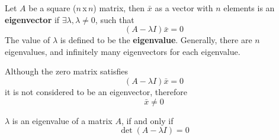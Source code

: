 \documentclass[diffeq.tex]{subfiles}
\begin{document}
    \begin{definition}
        Let $A$ be a square ($n$\,x\,$n$) matrix, then $\bar{x}$ as a vector with $n$ elements is an \textbf{eigenvector} if $\exists \lambda, \lambda \neq 0$, such that
        \begin{equation}
            (A - \lambda I)\bar{x} = 0
        \end{equation}
        The value of $\lambda$ is defined to be the \textbf{eigenvalue}.
        Generally, there are $n$ eigenvalues, and infinitely many eigenvectors for each eigenvalue.
    \end{definition}
    \begin{remark}
        Although the zero matrix satisfies
        \begin{equation}
            (A - \lambda I)\bar{x} = 0
        \end{equation}
        it is not considered to be an eigenvector, therefore
        \begin{equation}
            \bar{x} \neq 0
        \end{equation}
    \end{remark}
    \begin{theorem}[Eigenvalue]
        $\lambda$ is an eigenvalue of a matrix $A$, if and only if
        \begin{equation}
            \det(A - \lambda I) = 0
        \end{equation}
    \end{theorem}
\end{document}
